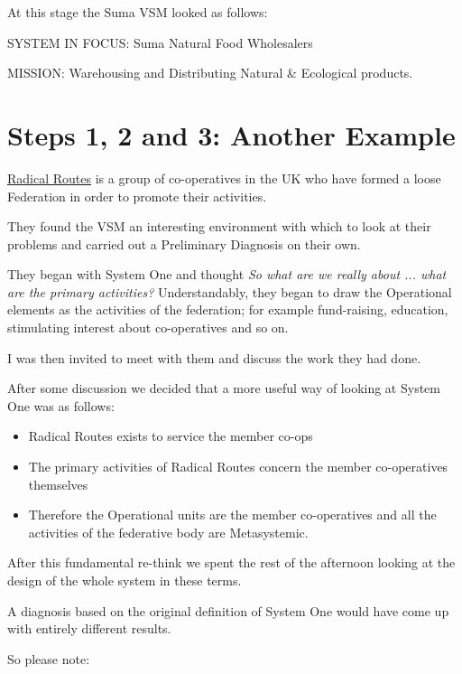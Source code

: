 At this stage the Suma VSM looked as follows:

SYSTEM IN FOCUS: Suma Natural Food Wholesalers

MISSION: Warehousing and Distributing Natural \& Ecological products.


\section*{Steps 1, 2 and 3: Another Example}
\href{http://www.radicalroutes.org.uk/}{Radical Routes} is a group of co-operatives in the UK who have formed a loose Federation in order to promote their activities.

They found the VSM an interesting environment with which to look at their problems and carried out a Preliminary Diagnosis on their own.

They began with System One and thought \textit{So what are we really about ... what are the primary activities?} Understandably, they began to draw the Operational elements as the activities of the federation; for example fund-raising, education, stimulating interest about co-operatives and so on.

I was then invited to meet with them and discuss the work they had done.

After some discussion we decided that a more useful way of looking at System One was as follows:

\begin{itemize}
  \item Radical Routes exists to service the member co-ops

  \item The primary activities of Radical Routes concern the member co-operatives themselves

  \item Therefore the Operational units are the member co-operatives and all the activities of the federative body are Metasystemic.

\end{itemize}

After this fundamental re-think we spent the rest of the afternoon looking at the design of the whole system in these terms.

A diagnosis based on the original definition of System One would have come up with entirely different results.

So please note:

